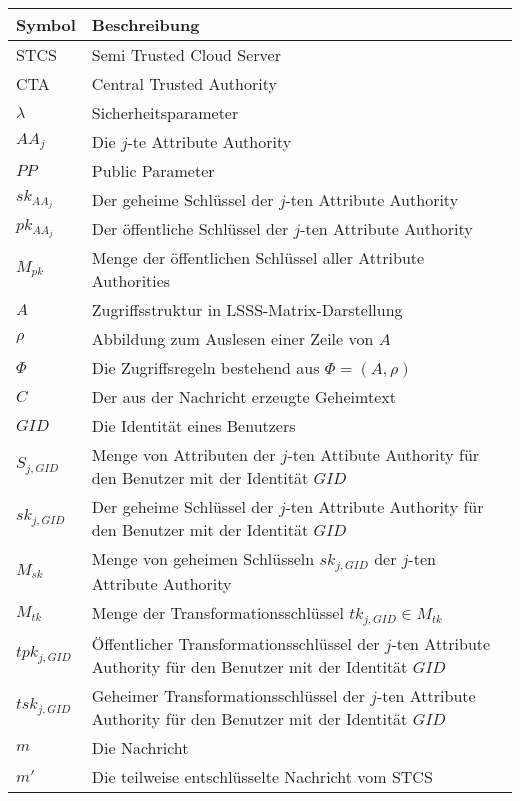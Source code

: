 \begin{center}
\begin{small}
	\begin{tabular}{p{3cm}p{9cm}}
		\hline
		Symbol & Beschreibung \\
		\hline
		STCS & Semi Trusted Cloud Server \\
		CTA & Central Trusted Authority \\
		$\lambda$ & Sicherheitsparameter \\
		$AA_j$ & Die $j$-te Attribute Authority \\
		$PP$ & Public Parameter \\
		$sk_{AA_j}$ & Der geheime Schlüssel der $j$-ten Attribute Authority \\
		$pk_{AA_j}$ & Der öffentliche Schlüssel der $j$-ten Attribute Authority \\
		$M_{pk}$ & Menge der öffentlichen Schlüssel aller Attribute Authorities \\
		$A$ & Zugriffsstruktur in LSSS-Matrix-Darstellung \\
		$\rho$ & Abbildung zum Auslesen einer Zeile von $A$ \\
		$\Phi$ & Die Zugriffsregeln bestehend aus $\Phi = \left(A, \rho\right)$ \\
		$C$ & Der aus der Nachricht erzeugte Geheimtext \\
		$GID$ & Die Identität eines Benutzers \\
		$S_{j, GID}$ & Menge von Attributen der $j$-ten Attibute Authority für den
		Benutzer mit der Identität $GID$ \\
		$sk_{j, GID}$ & Der geheime Schlüssel der $j$-ten Attribute Authority für
		den Benutzer mit der Identität $GID$ \\
		$M_{sk}$ & Menge von geheimen Schlüsseln $sk_{j, GID}$ der $j$-ten Attribute
		Authority \\
		$M_{tk}$ & Menge der Transformationsschlüssel $tk_{j, GID} \in M_{tk}$ \\
		$tpk_{j, GID}$ & Öffentlicher Transformationsschlüssel der $j$-ten
		Attribute Authority für den Benutzer mit der Identität $GID$ \\
		$tsk_{j, GID}$ & Geheimer Transformationsschlüssel der $j$-ten
		Attribute Authority für den Benutzer mit der Identität $GID$ \\
		$m$ & Die Nachricht \\
		$m'$ & Die teilweise entschlüsselte Nachricht vom STCS \\
		\hline
	\end{tabular}
\end{small}
\end{center}
